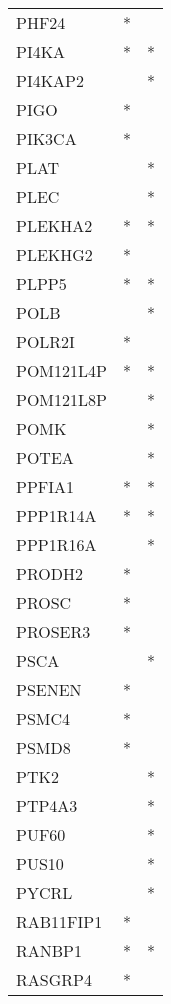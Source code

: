 \begin{longtable}{lcc}
PHF24        &         * &         \\
PI4KA        &         * &       * \\
PI4KAP2      &           &       * \\
PIGO         &         * &         \\
PIK3CA       &         * &         \\
PLAT         &           &       * \\
PLEC         &           &       * \\
PLEKHA2      &         * &       * \\
PLEKHG2      &         * &         \\
PLPP5        &         * &       * \\
POLB         &           &       * \\
POLR2I       &         * &         \\
POM121L4P    &         * &       * \\
POM121L8P    &           &       * \\
POMK         &           &       * \\
POTEA        &           &       * \\
PPFIA1       &         * &       * \\
PPP1R14A     &         * &       * \\
PPP1R16A     &           &       * \\
PRODH2       &         * &         \\
PROSC        &         * &         \\
PROSER3      &         * &         \\
PSCA         &           &       * \\
PSENEN       &         * &         \\
PSMC4        &         * &         \\
PSMD8        &         * &         \\
PTK2         &           &       * \\
PTP4A3       &           &       * \\
PUF60        &           &       * \\
PUS10        &           &       * \\
PYCRL        &           &       * \\
RAB11FIP1    &         * &         \\
RANBP1       &         * &       * \\
RASGRP4      &         * &         \\

\end{longtable}
